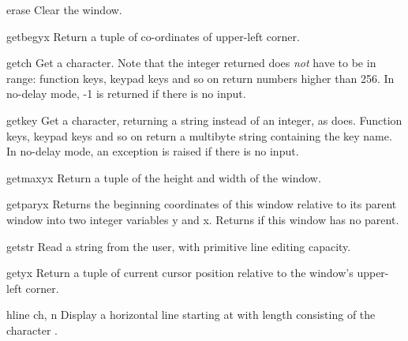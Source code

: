 \begin{methoddesc}[window]{erase}{}
Clear the window.
\end{methoddesc}

\begin{methoddesc}[window]{getbegyx}{}
Return a tuple  of co-ordinates of upper-left
corner.
\end{methoddesc}

\begin{methoddesc}[window]{getch}{}
Get a character. Note that the integer returned does \emph{not} have to
be in \ASCII{} range: function keys, keypad keys and so on return numbers
higher than 256. In no-delay mode, -1 is returned if there is 
no input.
\end{methoddesc}

\begin{methoddesc}[window]{getkey}{}
Get a character, returning a string instead of an integer, as
 does. Function keys, keypad keys and so on return a
multibyte string containing the key name.  In no-delay mode, an
exception is raised if there is no input.
\end{methoddesc}

\begin{methoddesc}[window]{getmaxyx}{}
Return a tuple  of the height and width of
the window.
\end{methoddesc}

\begin{methoddesc}[window]{getparyx}{}
Returns the beginning coordinates of this window relative to its
parent window into two integer variables y and x.  Returns
 if this window has no parent.
\end{methoddesc}

\begin{methoddesc}[window]{getstr}{}
Read a string from the user, with primitive line editing capacity.
\end{methoddesc}

\begin{methoddesc}[window]{getyx}{}
Return a tuple  of current cursor position 
relative to the window's upper-left corner.
\end{methoddesc}

\begin{methoddesc}[window]{hline}{ ch, n}
Display a horizontal line starting at  with
length  consisting of the character .
\end{methoddesc}

